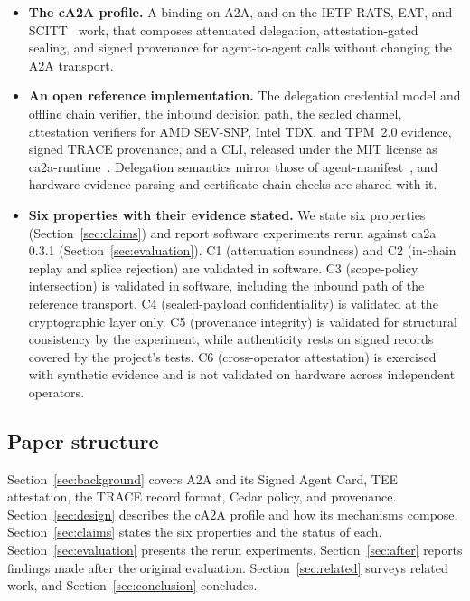 \begin{itemize}[leftmargin=1.5em]
  \item \textbf{The cA2A profile.} A binding on A2A, and on the IETF RATS, EAT, and
    SCITT~\citep{scitt2024} work, that composes attenuated delegation, attestation-gated sealing,
    and signed provenance for agent-to-agent calls without changing the A2A transport.
  \item \textbf{An open reference implementation.} The delegation credential model and offline
    chain verifier, the inbound decision path, the sealed channel, attestation verifiers for AMD
    SEV-SNP, Intel TDX, and TPM~2.0 evidence, signed TRACE provenance, and a CLI, released under
    the MIT license as ca2a-runtime~\citep{ca2arepo2026}. Delegation semantics mirror those of
    agent-manifest~\citep{agentmanifest2026}, and hardware-evidence parsing and certificate-chain
    checks are shared with it.
  \item \textbf{Six properties with their evidence stated.} We state six properties
    (Section~\ref{sec:claims}) and report software experiments rerun against ca2a 0.3.1
    (Section~\ref{sec:evaluation}). C1 (attenuation soundness) and C2 (in-chain replay and splice
    rejection) are validated in software. C3 (scope-policy intersection) is validated in software,
    including the inbound path of the reference transport. C4 (sealed-payload confidentiality) is
    validated at the cryptographic layer only. C5 (provenance integrity) is validated for
    structural consistency by the experiment, while authenticity rests on signed records covered by
    the project's tests. C6 (cross-operator attestation) is exercised with synthetic evidence and
    is not validated on hardware across independent operators.
\end{itemize}

\subsection*{Paper structure}

Section~\ref{sec:background} covers A2A and its Signed Agent Card, TEE attestation, the TRACE
record format, Cedar policy, and provenance. Section~\ref{sec:design} describes the cA2A profile
and how its mechanisms compose. Section~\ref{sec:claims} states the six properties and the status
of each. Section~\ref{sec:evaluation} presents the rerun experiments. Section~\ref{sec:after}
reports findings made after the original evaluation. Section~\ref{sec:related} surveys related
work, and Section~\ref{sec:conclusion} concludes.
